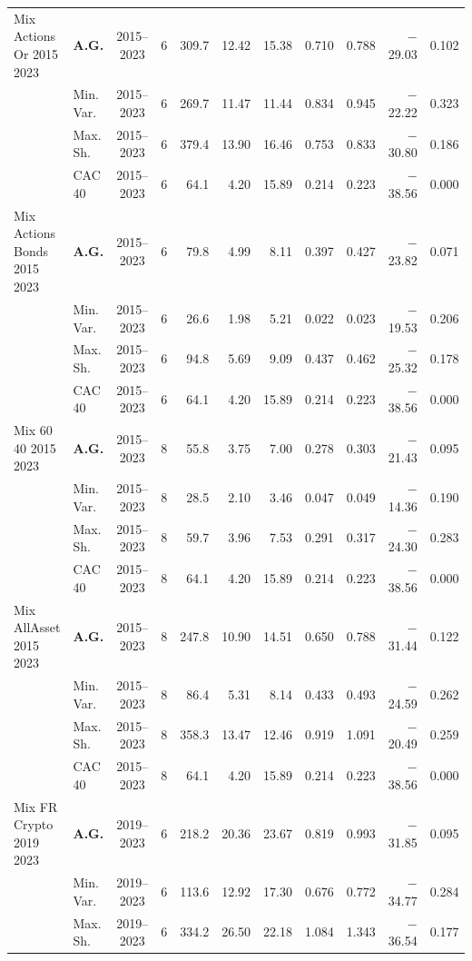 \begin{longtable}{p{2.6cm} l c c r r r r r r r}
\midrule
Mix Actions Or 2015 2023 & \textbf{A.G.} & 2015--2023 & 6 & 309.7 & 12.42 & 15.38 & 0.710 & 0.788 & $-$29.03 & 0.102 \\
 & Min.\,Var. & 2015--2023 & 6 & 269.7 & 11.47 & 11.44 & 0.834 & 0.945 & $-$22.22 & 0.323 \\
 & Max.\,Sh. & 2015--2023 & 6 & 379.4 & 13.90 & 16.46 & 0.753 & 0.833 & $-$30.80 & 0.186 \\
 & CAC 40 & 2015--2023 & 6 & 64.1 & 4.20 & 15.89 & 0.214 & 0.223 & $-$38.56 & 0.000 \\
\midrule
Mix Actions Bonds 2015 2023 & \textbf{A.G.} & 2015--2023 & 6 & 79.8 & 4.99 & 8.11 & 0.397 & 0.427 & $-$23.82 & 0.071 \\
 & Min.\,Var. & 2015--2023 & 6 & 26.6 & 1.98 & 5.21 & 0.022 & 0.023 & $-$19.53 & 0.206 \\
 & Max.\,Sh. & 2015--2023 & 6 & 94.8 & 5.69 & 9.09 & 0.437 & 0.462 & $-$25.32 & 0.178 \\
 & CAC 40 & 2015--2023 & 6 & 64.1 & 4.20 & 15.89 & 0.214 & 0.223 & $-$38.56 & 0.000 \\
\midrule
Mix 60 40 2015 2023 & \textbf{A.G.} & 2015--2023 & 8 & 55.8 & 3.75 & 7.00 & 0.278 & 0.303 & $-$21.43 & 0.095 \\
 & Min.\,Var. & 2015--2023 & 8 & 28.5 & 2.10 & 3.46 & 0.047 & 0.049 & $-$14.36 & 0.190 \\
 & Max.\,Sh. & 2015--2023 & 8 & 59.7 & 3.96 & 7.53 & 0.291 & 0.317 & $-$24.30 & 0.283 \\
 & CAC 40 & 2015--2023 & 8 & 64.1 & 4.20 & 15.89 & 0.214 & 0.223 & $-$38.56 & 0.000 \\
\midrule
Mix AllAsset 2015 2023 & \textbf{A.G.} & 2015--2023 & 8 & 247.8 & 10.90 & 14.51 & 0.650 & 0.788 & $-$31.44 & 0.122 \\
 & Min.\,Var. & 2015--2023 & 8 & 86.4 & 5.31 & 8.14 & 0.433 & 0.493 & $-$24.59 & 0.262 \\
 & Max.\,Sh. & 2015--2023 & 8 & 358.3 & 13.47 & 12.46 & 0.919 & 1.091 & $-$20.49 & 0.259 \\
 & CAC 40 & 2015--2023 & 8 & 64.1 & 4.20 & 15.89 & 0.214 & 0.223 & $-$38.56 & 0.000 \\
\midrule
Mix FR Crypto 2019 2023 & \textbf{A.G.} & 2019--2023 & 6 & 218.2 & 20.36 & 23.67 & 0.819 & 0.993 & $-$31.85 & 0.095 \\
 & Min.\,Var. & 2019--2023 & 6 & 113.6 & 12.92 & 17.30 & 0.676 & 0.772 & $-$34.77 & 0.284 \\
 & Max.\,Sh. & 2019--2023 & 6 & 334.2 & 26.50 & 22.18 & 1.084 & 1.343 & $-$36.54 & 0.177 \\

\end{longtable}
